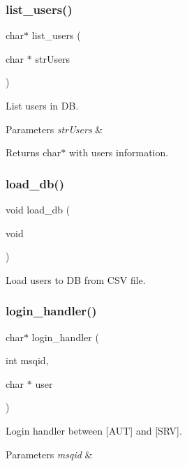 \subsubsection{list\+\_\+users()}
{\footnotesize\ttfamily char$\ast$ list\+\_\+users (\begin{DoxyParamCaption}\item[{char $\ast$}]{str\+Users }\end{DoxyParamCaption})}



List users in DB. 


\begin{DoxyParams}{Parameters}
{\em str\+Users} & \\
\hline
\end{DoxyParams}
\begin{DoxyReturn}{Returns}
char$\ast$ with users information. 
\end{DoxyReturn}
\mbox{\label{auth_8c_aca138a298c612a14d6fb2c16672f8c87}} 
\subsubsection{load\+\_\+db()}
{\footnotesize\ttfamily void load\+\_\+db (\begin{DoxyParamCaption}\item[{void}]{ }\end{DoxyParamCaption})}



Load users to DB from C\+SV file. 

\mbox{\label{auth_8c_adac4679e3a9744c45353d68b35bd1aba}} 
\subsubsection{login\+\_\+handler()}
{\footnotesize\ttfamily char$\ast$ login\+\_\+handler (\begin{DoxyParamCaption}\item[{int}]{msqid,  }\item[{char $\ast$}]{user }\end{DoxyParamCaption})}



Login handler between [A\+UT] and [S\+RV]. 


\begin{DoxyParams}{Parameters}
{\em msqid} & \\
\hline
\end{DoxyParams}
\mbox{\label{auth_8c_a840291bc02cba5474a4cb46a9b9566fe}} 
